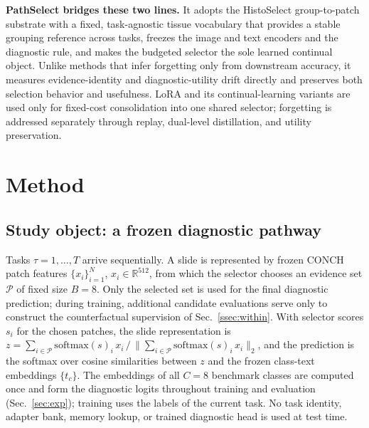 \documentclass{article}
\newcommand{\Psel}{\mathcal{P}}
\begin{document}
\textbf{PathSelect bridges these two lines.}
It adopts the HistoSelect group-to-patch substrate with a fixed, task-agnostic tissue vocabulary that provides a stable grouping reference across tasks, freezes the image and text encoders and the diagnostic rule, and makes the budgeted selector the sole learned continual object. Unlike methods that infer forgetting only from downstream accuracy, it measures evidence-identity and diagnostic-utility drift directly and preserves both selection behavior and usefulness. LoRA \cite{hu2022lora} and its continual-learning variants \cite{liang2024inflora,wu2025sdlora,he2025cllora,chen2026flexem} are used only for fixed-cost consolidation into one shared selector; forgetting is addressed separately through replay, dual-level distillation, and utility preservation.

\section{Method}
\label{sec:method}

\subsection{Study object: a frozen diagnostic pathway}
\label{ssec:setup}

Tasks $\tau=1,\ldots,T$ arrive sequentially. A slide is represented by frozen CONCH patch features $\{x_i\}_{i=1}^{N}$, $x_i\in\mathbb{R}^{512}$, from which the selector chooses an evidence set $\Psel$ of fixed size $B=8$. Only the selected set is used for the final diagnostic prediction; during training, additional candidate evaluations serve only to construct the counterfactual supervision of Sec.~\ref{ssec:within}. With selector scores $s_i$ for the chosen patches, the slide representation is $z=\sum_{i\in\Psel}\mathrm{softmax}(s)_i\,x_i\,/\,\bigl\|\sum_{i\in\Psel}\mathrm{softmax}(s)_i\,x_i\bigr\|_2$, and the prediction is the softmax over cosine similarities between $z$ and the frozen class-text embeddings $\{t_c\}$. The embeddings of all $C=8$ benchmark classes are computed once and form the diagnostic logits throughout training and evaluation (Sec.~\ref{sec:exp}); training uses the labels of the current task. No task identity, adapter bank, memory lookup, or trained diagnostic head is used at test time.
\end{document}
